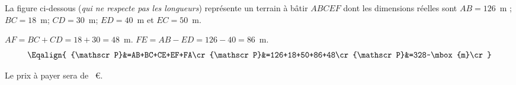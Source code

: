 La figure ci-dessous ({\em qui ne respecte pas les longueurs})
représente un terrain à bâtir $ABCEF$ dont les dimensions réelles sont
$AB=126$~m ; $BC=18$~m; $CD=30$~m; $ED=40$~m et $EC=50$~m.
\par{}
\begin{myenumerate}
  \item $AF=BC+CD=18+30=48$~m. $FE=AB-ED=126-40=86$~m.
    \[\Eqalign{
      {\mathscr P}&=AB+BC+CE+EF+FA\cr
      {\mathscr P}&=126+18+50+86+48\cr
      {\mathscr P}&=328~\mbox{m}\cr
    }\]
  \item\hfill\newline{}\hfill Le
    prix à payer sera de ~\textgreek{\euro}.
\end{myenumerate}